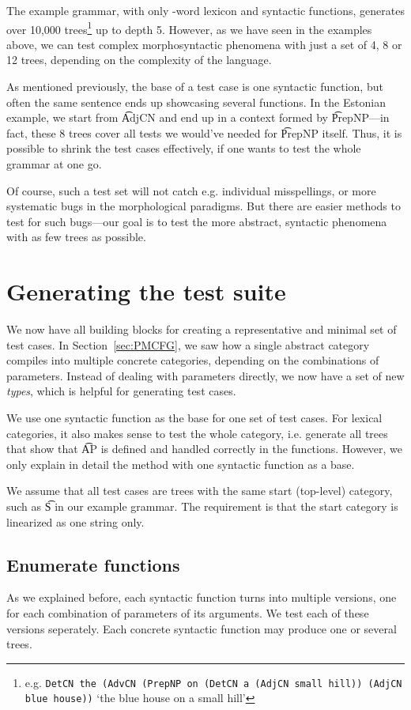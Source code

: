 \label{sec:wishlist_comments}
The example grammar, with only \numOfLex{}-word lexicon and \numOfFun{} syntactic functions,
generates over 10,000 %
trees\footnote{e.g. {\tt DetCN the (AdvCN (PrepNP on
(DetCN a (AdjCN small hill)) (AdjCN blue house))} `the blue house on a
small hill'}  up to depth 5. 
However, as we have seen in the examples above, we can test complex
morphosyntactic phenomena with just a set of 4, 8 or 12 trees,
depending on the complexity of the language. 

As mentioned previously, the base of a test case is one syntactic
function, but often the same sentence ends up showcasing several
functions. In the Estonian example, we start from \t{AdjCN} 
and end up in a context formed by \t{PrepNP}---in fact, these 8 trees
cover all tests we would've needed for \t{PrepNP} itself. Thus,
it is possible to shrink the test cases effectively, if one wants to
test the whole grammar at one go.

Of course, such a test set will not catch e.g. individual
misspellings, or more systematic bugs in the morphological
paradigms. But there are easier methods to test for such bugs---our 
goal is to test the more abstract, syntactic phenomena with as few
trees as possible.  


\section{Generating the test suite}
\label{sec:testing}

We now have all building blocks for creating a representative and
minimal set of test cases.
In Section~\ref{sec:PMCFG}, we saw how a single abstract category
compiles into multiple concrete categories, depending on the
combinations of parameters. Instead of dealing with parameters
directly, we now have a set of new \emph{types}, which is helpful for
generating test cases.

We use one syntactic function as the base for one set of test
cases. For lexical categories, it also makes sense to test the whole
category, i.e. generate all trees that show that \t{AP} is defined and
handled correctly in the functions. However, we only explain in detail
the method with one syntactic function as a base.

We assume that all test cases are trees with the same start
(top-level) category, such as \t{S} in our example grammar. The
requirement is that the start category is linearized as one string only. 

\subsection{Enumerate functions} As we explained before, each syntactic
function turns into multiple versions, one for each combination of
parameters of its arguments. We test each of these versions
seperately. Each concrete syntactic function may produce one or several trees.


